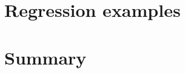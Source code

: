 \documentclass[a4paper]{jpconf}
\begin{document}
\section{Regression examples}

\section{Summary}





\end{document}
